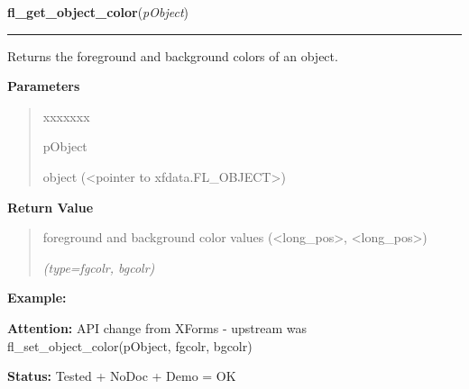 \hspace{.8\funcindent}\begin{boxedminipage}{\funcwidth}

    \raggedright \textbf{fl\_get\_object\_color}(\textit{pObject})

    \vspace{-1.5ex}

    \rule{\textwidth}{0.5\fboxrule}
\setlength{\parskip}{2ex}
    Returns the foreground and background colors of an object.

\setlength{\parskip}{1ex}
      \textbf{Parameters}
      \vspace{-1ex}

      \begin{quote}
        \begin{Ventry}{xxxxxxx}

          \item[pObject]

          object ({\textless}pointer to xfdata.FL\_OBJECT{\textgreater})

        \end{Ventry}

      \end{quote}

      \textbf{Return Value}
    \vspace{-1ex}

      \begin{quote}
      foreground and background color values 
      ({\textless}long\_pos{\textgreater}, 
      {\textless}long\_pos{\textgreater})

      {\it (type=fgcolr, bgcolr)}

      \end{quote}

\textbf{Example:} 

\textbf{Attention:} API change from XForms - upstream was fl\_set\_object\_color(pObject, 
fgcolr, bgcolr)



\textbf{Status:} Tested + NoDoc + Demo = OK



    \end{boxedminipage}

    \label{xformslib:library:fl_set_object_label}

    \vspace{0.5ex}

